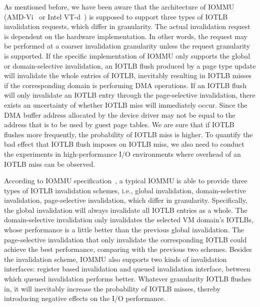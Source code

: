 As mentioned before, we have been aware that the architecture of IOMMU (AMD-Vi~\cite{amdvt} or Intel VT-d~\cite{intelvt}) is supposed to support three types of IOTLB invalidation requests, which differ in granularity. The actual invalidation request is dependent on the hardware implementation. In other words, the request may be performed at a coarser invalidation granularity unless the request granularity is supported. If the specific implementation of IOMMU only supports the global or domain-selective invalidation, an IOTLB flush produced by a page type update will invalidate the whole entries of IOTLB, inevitably resulting in IOTLB misses if the corresponding domain is performing DMA operations. If an IOTLB flush will only invalidate an IOTLB entry through the page-selective invalidation, there exists an uncertainty of whether IOTLB miss will immediately occur. Since the DMA buffer address allocated by the device driver may not be equal to the address that is to be used by guest page tables. We are sure that if IOTLB flushes more frequently, the probability of IOTLB miss is higher. To quantify the bad effect that IOTLB flush imposes on IOTLB miss, we also need to conduct the experiments in high-performance I/O environments where overhead of an IOTLB miss can be observed.

According to IOMMU specification~\cite{intelvt}, a typical IOMMU is able to provide three types of IOTLB invalidation schemes, i.e., global invalidation, domain-selective invalidation, page-selective invalidation, which differ in granularity.
Specifically, the global invalidation will always invalidate all IOTLB entries as a whole.
The domain-selective invalidation only invalidates the selected VM domain's IOTLBs, whose performance is a little better than the previous global invalidation.
The page-selective invalidation that only invalidate the corresponding IOTLB could achieve the best performance, comparing with the previous two schemes.
Besides the invalidation scheme, IOMMU also supports two kinds of invalidation interfaces: register based invalidation and queued invalidation interface, between which queued invalidation performs better.
Whatever granularity IOTLB flushes in, it will inevitably increase the probability of IOTLB misses, thereby introducing negative effects on the I/O performance.


